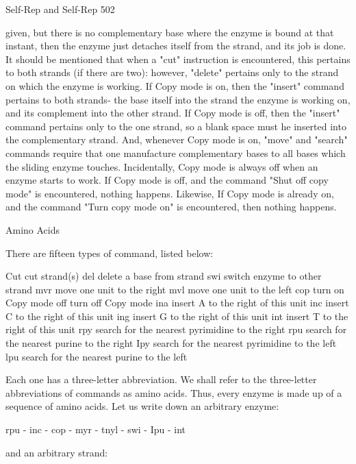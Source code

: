 {Self-Rep and Self-Rep                                                                        502

given, but there is no complementary base where the enzyme is bound at that instant, then the
enzyme just detaches itself from the strand, and its job is done.
        It should be mentioned that when a "cut" instruction is encountered, this pertains to
both strands (if there are two): however, "delete" pertains only to the strand on which the
enzyme is working. If Copy mode is on, then the "insert" command pertains to both strands-
the base itself into the strand the enzyme is working on, and its complement into the other
strand.
If Copy mode is off, then the "insert" command pertains only to the one strand, so a blank
space must he inserted into the complementary strand.
        And, whenever Copy mode is on, "move" and "search" commands require that one
manufacture complementary bases to all bases which the sliding enzyme touches.
Incidentally, Copy mode is always off when an enzyme starts to work. If Copy mode is off,
and the command "Shut off copy mode" is encountered, nothing happens. Likewise, If Copy
mode is already on, and the command "Turn copy mode on" is encountered, then nothing
happens.

                                           Amino Acids

There are fifteen types of command, listed below:

    Cut         cut strand(s)
    del         delete a base from strand
    swi         switch enzyme to other strand
    mvr         move one unit to the right
    mvl         move one unit to the left
    cop         turn on Copy mode
    off         turn off Copy mode
    ina         insert A to the right of this unit
    inc         insert C to the right of this unit
    ing         insert G to the right of this unit
    int         insert T to the right of this unit
    rpy         search for the nearest pyrimidine to the right
    rpu         search for the nearest purine to the right
    Ipy         search for the nearest pyrimidine to the left
    lpu         search for the nearest purine to the left

Each one has a three-letter abbreviation. We shall refer to the three-letter abbreviations of
commands as amino acids. Thus, every enzyme is made up of a sequence of amino acids. Let
us write down an arbitrary enzyme:

       rpu - inc - cop - myr - tnyl - swi - Ipu - int

and an arbitrary strand:

}
